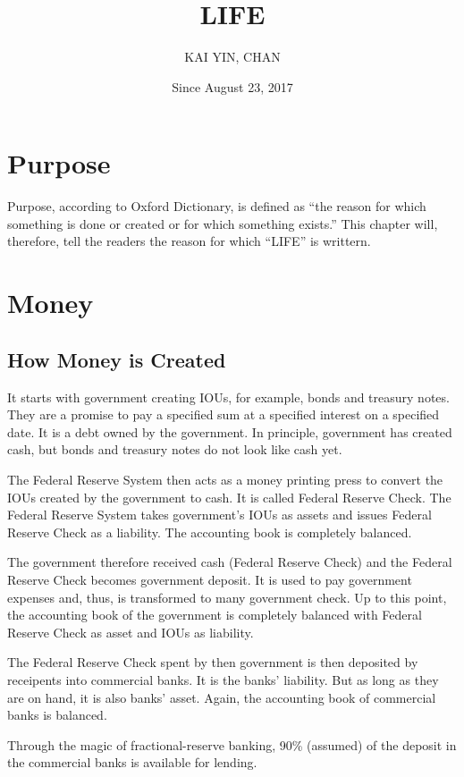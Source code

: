 \documentclass[a4paper]{report}
\begin{document}
\title{LIFE}
\author{KAI YIN, CHAN}
\date{Since August 23, 2017}
\maketitle

\chapter{Purpose}
Purpose, according to Oxford Dictionary, is defined as ``the reason for which something is done or created or for which something exists.'' This chapter will, therefore, tell the readers the reason for which ``LIFE'' is writtern.

\chapter{Money}
\section{How Money is Created}
It starts with government creating IOUs, for example, bonds and treasury notes. They are a promise to pay a specified sum at a specified interest on a specified date. It is a debt owned by the government. In principle, government has created cash, but bonds and treasury notes do not look like cash yet.

The Federal Reserve System then acts as a money printing press to convert the IOUs created by the government to cash. It is called Federal Reserve Check. The Federal Reserve System takes government's IOUs as assets and issues Federal Reserve Check as a liability. The accounting book is completely balanced.

The government therefore received cash (Federal Reserve Check) and the Federal Reserve Check becomes government deposit. It is used to pay government expenses and, thus, is transformed to many government check. Up to this point, the accounting book of the government is completely balanced with Federal Reserve Check as asset and IOUs as liability.

The Federal Reserve Check spent by then government is then deposited by receipents into commercial banks. It is the banks' liability. But as long as they are on hand, it is also banks' asset. Again, the accounting book of commercial banks is balanced. 

Through the magic of fractional-reserve banking, 90\% (assumed) of the deposit in the commercial banks is available for lending.
\end{document}
